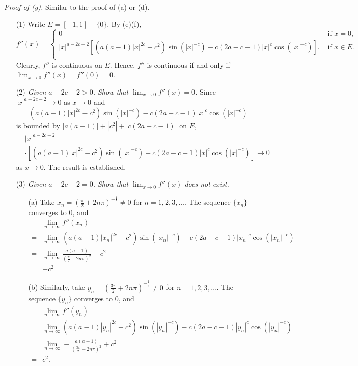 \documentclass{article}
\begin{document}
\emph{Proof of (g).}
Similar to the proof of (a) or (d).
\begin{enumerate}
  \item[(1)]
  Write $E = [-1,1] - \{0\}$.
  By (e)(f),
  \begin{equation*}
  f''(x) =
    \begin{cases}
      0
        & \text{ if } x = 0, \\
      |x|^{a-2c-2} \left[
        ( a(a-1)|x|^{2c} - c^2 ) \sin(|x|^{-c}) - c(2a-c-1)|x|^c\cos(|x|^{-c})
      \right].
        & \text{ if } x \in E. \\
    \end{cases}
  \end{equation*}
  Clearly, $f''$ is continuous on $E$.
  Hence, $f''$ is continuous if and only if $\lim_{x \to 0} f''(x) = f''(0) = 0$.

  \item[(2)]
  \emph{Given $a-2c-2 > 0$.
  Show that $\lim_{x \to 0} f''(x) = 0$.}
  Since $|x|^{a-2c-2} \to 0$ as $x \to 0$ and
  \[
    ( a(a-1)|x|^{2c} - c^2 ) \sin(|x|^{-c}) - c(2a-c-1)|x|^c\cos(|x|^{-c})
  \]
  is bounded by $|a(a-1)| + |c^2| + |c(2a-c-1)|$ on $E$,
  \begin{align*}
    &|x|^{a-2c-2} \\
    &\cdot \left[
      ( a(a-1)|x|^{2c} - c^2 ) \sin(|x|^{-c}) - c(2a-c-1)|x|^c\cos(|x|^{-c})
    \right] \to 0
  \end{align*}
  as $x \to 0$.
  The result is established.

  \item[(3)]
  \emph{Given $a-2c-2 = 0$.
  Show that $\lim_{x \to 0} f''(x)$ does not exist.}
  \begin{enumerate}
    \item[(a)]
    Take $x_n = \left( \frac{\pi}{2} + 2n\pi \right)^{-\frac{1}{c}} \neq 0$
    for $n = 1, 2, 3, \ldots$.
    The sequence $\{ x_n \}$ converges to $0$, and
    \begin{align*}
      &\lim_{n \to \infty} f''(x_n) \\
      =& \lim_{n \to \infty}
        ( a(a-1)|x_n|^{2c} - c^2 ) \sin(|x_n|^{-c}) - c(2a-c-1)|x_n|^c\cos(|x_n|^{-c}) \\
      =& \lim_{n \to \infty} \frac{a(a-1)}{\left( \frac{\pi}{2} + 2n\pi \right)^2} - c^2 \\
      =& -c^2
    \end{align*}

    \item[(b)]
    Similarly, take $y_n = \left( \frac{3\pi}{2} + 2n\pi \right)^{-\frac{1}{c}} \neq 0$
    for $n = 1, 2, 3, \ldots$.
    The sequence $\{ y_n \}$ converges to $0$, and
    \begin{align*}
      &\lim_{n \to \infty} f''(y_n) \\
      =& \lim_{n \to \infty}
        ( a(a-1)|y_n|^{2c} - c^2 ) \sin(|y_n|^{-c}) - c(2a-c-1)|y_n|^c\cos(|y_n|^{-c}) \\
      =& \lim_{n \to \infty} -\frac{a(a-1)}{\left( \frac{3\pi}{2} + 2n\pi \right)^2} + c^2 \\
      =& c^2.
    \end{align*}


\end{enumerate}
\end{enumerate}
\end{document}

